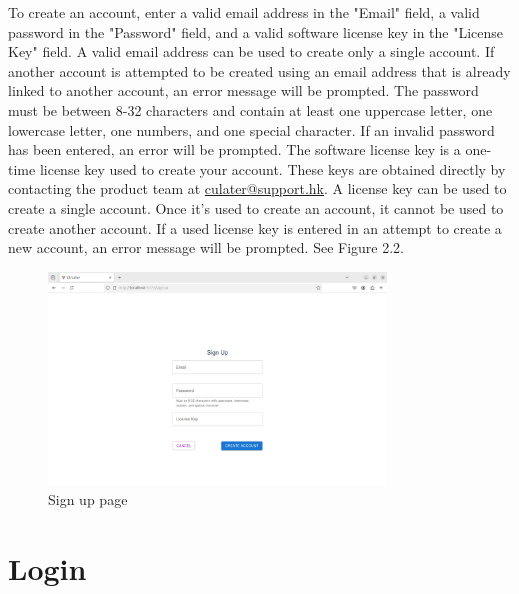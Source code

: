 \documentclass{scrreprt}
\begin{document}
To create an account, enter a valid email address in the "Email" field, a valid password in the "Password" field, and a valid software license key in the "License Key" field. A valid email address can be used to create only a single account. If another account is attempted to be created using an email address that is already linked to another account, an error message will be prompted. The password must be between 8-32 characters and contain at least one uppercase letter, one lowercase letter, one numbers, and one special character. If an invalid password has been entered, an error will be prompted. The software license key is a one-time license key used to create your account. These keys are obtained directly by contacting the product team at \href{mailto:culater@support.hk}{culater@support.hk}. A license key can be used to create a single account. Once it's used to create an account, it cannot be used to create another account. If a used license key is entered in an attempt to create a new account, an error message will be prompted. See Figure 2.2.\\
\begin{figure}[htbp]
        \centering
        \includegraphics[width=0.8\textwidth]{sign_up_page.png}
	\caption{Sign up page}
	\label{fig:my_label}
\end{figure}

\chapter{Login}
\end{document}
